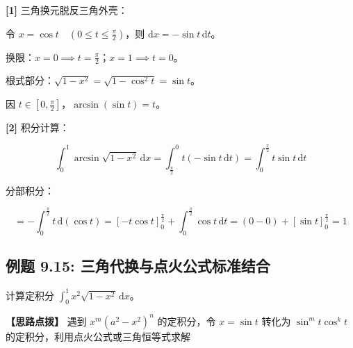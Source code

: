 \documentclass[11pt,a4paper,UTF8]{ctexart}
\begin{document}
\begin{solbox}[分步推导与答题规范]
\textbf{[1]} 三角换元脱反三角外壳：

令 $x = \cos t \quad \left(0 \leqslant t \leqslant \frac{\pi}{2}\right)$，则 $\mathrm{d}x = -\sin t\,\mathrm{d}t$。

换限：$x=0 \implies t=\frac{\pi}{2}$；$x=1 \implies t=0$。

根式部分：$\sqrt{1-x^2} = \sqrt{1-\cos^2 t} = \sin t$。

因 $t \in [0, \frac{\pi}{2}]$，$\arcsin(\sin t) = t$。

\textbf{[2]} 积分计算：


\begin{equation*}
\int_0^1 \arcsin\sqrt{1-x^2}\,\mathrm{d}x = \int_{\frac{\pi}{2}}^0 t(-\sin t\,\mathrm{d}t) = \int_0^{\frac{\pi}{2}} t\sin t\,\mathrm{d}t
\end{equation*}


分部积分：


\begin{equation*}
= -\int_0^{\frac{\pi}{2}} t\,\mathrm{d}(\cos t) = \left[ -t\cos t \right]_0^{\frac{\pi}{2}} + \int_0^{\frac{\pi}{2}} \cos t\,\mathrm{d}t = (0 - 0) + [\sin t]_0^{\frac{\pi}{2}} = 1
\end{equation*}

\end{solbox}


\subsection{例题 9.15: 三角代换与点火公式标准结合}

计算定积分 $\int_0^1 x^2\sqrt{1-x^2}\,\mathrm{d}x$。

\textbf{\color{DeepPurple}【思路点拨】} 遇到 $x^m (a^2-x^2)^n$ 的定积分，令 $x = \sin t$ 转化为 $\sin^m t \cos^k t$ 的定积分，利用点火公式或三角恒等式求解
\end{document}
